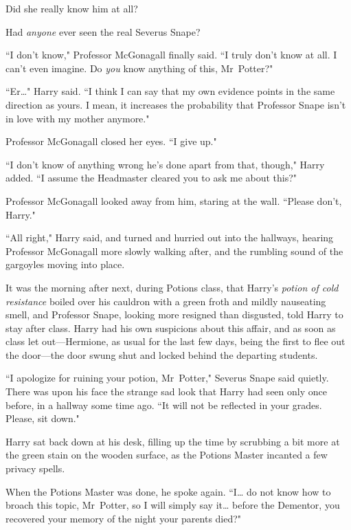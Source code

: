 Did she really know him at all?

Had \emph{anyone} ever seen the real Severus Snape?

\later

``I don't know," Professor McGonagall finally said. ``I truly don't know at all. I can't even imagine. Do \emph{you} know anything of this, Mr~Potter?"

``Er{\ldots}" Harry said. ``I think I can say that my own evidence points in the same direction as yours. I mean, it increases the probability that Professor Snape isn't in love with my mother anymore."

Professor McGonagall closed her eyes. ``I give up."

``I don't know of anything wrong he's done apart from that, though," Harry added. ``I assume the Headmaster cleared you to ask me about this?"

Professor McGonagall looked away from him, staring at the wall. ``Please don't, Harry."

``All right," Harry said, and turned and hurried out into the hallways, hearing Professor McGonagall more slowly walking after, and the rumbling sound of the gargoyles moving into place.

\later

It was the morning after next, during Potions class, that Harry's \emph{potion of cold resistance} boiled over his cauldron with a green froth and mildly nauseating smell, and Professor Snape, looking more resigned than disgusted, told Harry to stay after class. Harry had his own suspicions about this affair, and as soon as class let out—Hermione, as usual for the last few days, being the first to flee out the door—the door swung shut and locked behind the departing students.

``I apologize for ruining your potion, Mr~Potter," Severus Snape said quietly. There was upon his face the strange sad look that Harry had seen only once before, in a hallway some time ago. ``It will not be reflected in your grades. Please, sit down."

Harry sat back down at his desk, filling up the time by scrubbing a bit more at the green stain on the wooden surface, as the Potions Master incanted a few privacy spells.

When the Potions Master was done, he spoke again. ``I{\ldots} do not know how to broach this topic, Mr~Potter, so I will simply say it{\ldots} before the Dementor, you recovered your memory of the night your parents died?"

